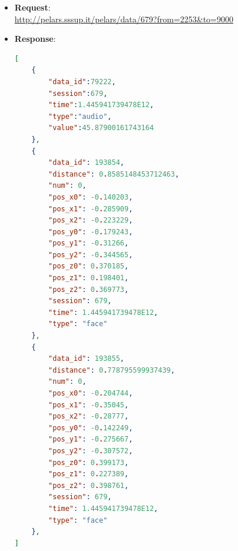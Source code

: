\documentclass[a4paper,notitlepage,onecolumn]{hitec}  %
\begin{document}
\begin{itemize}
\item\textbf{Request}: \\ \url{http://pelars.sssup.it/pelars/data/679?from=2253&to=9000} 
\item \textbf{Response}: 
\begin{lstlisting}[language=json,firstnumber=1]
[  
   	{  
      	"data_id":79222,
      	"session":679,
      	"time":1.445941739478E12,
      	"type":"audio",
      	"value":45.87900161743164
   	},
   	{
        "data_id": 193854,
        "distance": 0.8585148453712463,
        "num": 0,
        "pos_x0": -0.140203,
        "pos_x1": -0.285909,
        "pos_x2": -0.223229,
        "pos_y0": -0.179243,
        "pos_y1": -0.31266,
        "pos_y2": -0.344565,
        "pos_z0": 0.370185,
        "pos_z1": 0.198401,
        "pos_z2": 0.369773,
        "session": 679,
        "time": 1.445941739478E12,
        "type": "face"
    },
    {
        "data_id": 193855,
        "distance": 0.778795599937439,
        "num": 0,
        "pos_x0": -0.204744,
        "pos_x1": -0.35045,
        "pos_x2": -0.28777,
        "pos_y0": -0.142249,
        "pos_y1": -0.275667,
        "pos_y2": -0.307572,
        "pos_z0": 0.399173,
        "pos_z1": 0.227389,
        "pos_z2": 0.398761,
        "session": 679,
        "time": 1.445941739478E12,
        "type": "face"
    },
]
\end{lstlisting}
\end{itemize}
\end{document}

